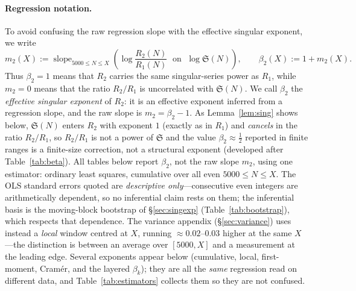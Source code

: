 \documentclass[]{interact}%
\newcommand{\sing}{\mathfrak S}
\begin{document}
\paragraph{Regression notation.}
To avoid confusing the raw regression slope with the effective singular exponent, we write
\[
m_2(X):=
\operatorname{slope}_{5000\le N\le X}
\left(
\log\frac{R_2(N)}{R_1(N)}
\;\text{ on }\;
\log\sing(N)
\right),
\qquad
\beta_2(X):=1+m_2(X).
\]
Thus $\beta_2=1$ means that $R_2$ carries the same singular-series power as $R_1$, while
$m_2=0$ means that the ratio $R_2/R_1$ is uncorrelated with $\sing(N)$. We call $\beta_2$ the
\emph{effective singular exponent} of $R_2$: it is an effective exponent inferred from a
regression slope, and the raw slope is $m_2=\beta_2-1$. As Lemma~\ref{lem:sing} shows below,
$\sing(N)$ enters $R_2$ with exponent $1$ (exactly as in $R_1$) and \emph{cancels} in the
ratio $R_2/R_1$, so $R_2/R_1$ is not a power of $\sing$ and the value $\beta_2\approx\tfrac12$
reported in finite ranges is a finite-size correction, not a structural exponent (developed
after Table~\ref{tab:beta}). All tables below report $\beta_2$, not the raw slope $m_2$, using
one estimator: ordinary least squares, cumulative over all even $5000\le N\le X$.
The OLS standard errors quoted are \emph{descriptive only}---consecutive even integers are
arithmetically dependent, so no inferential claim rests on them; the inferential basis is the
moving-block bootstrap of \S\ref{sec:singexp} (Table~\ref{tab:bootstrap}), which respects that
dependence. The variance appendix (\S\ref{sec:variance}) uses instead a \emph{local} window
centred at $X$, running $\approx0.02$--$0.03$ higher at the same $X$---the distinction is between
an average over $[5000,X]$ and a measurement at the leading edge. Several exponents appear below
(cumulative, local, first-moment, Cram\'er, and the layered $\beta_k$); they are all the
\emph{same} regression read on different data, and Table~\ref{tab:estimators} collects them so
they are not confused.
\end{document}
